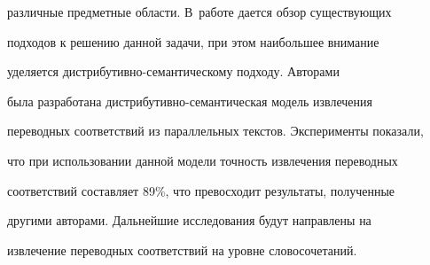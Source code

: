 различные предметные области. В~работе дается обзор существующих


подходов к решению данной задачи, при этом наибольшее внимание


уделяется дис\-три\-бу\-тив\-но-се\-ман\-ти\-че\-ско\-му подходу. Авторами


была разработана дистрибутивно-семантическая модель извлечения


переводных соответствий из параллельных текстов. Эксперименты показали,


что при использовании данной модели точность извлечения переводных


соответствий составляет 89\%, что превосходит результаты, полученные


другими авторами. Дальнейшие исследования будут направлены на


извлечение переводных соответствий на уровне словосочетаний.





\vspace*{-2pt}





